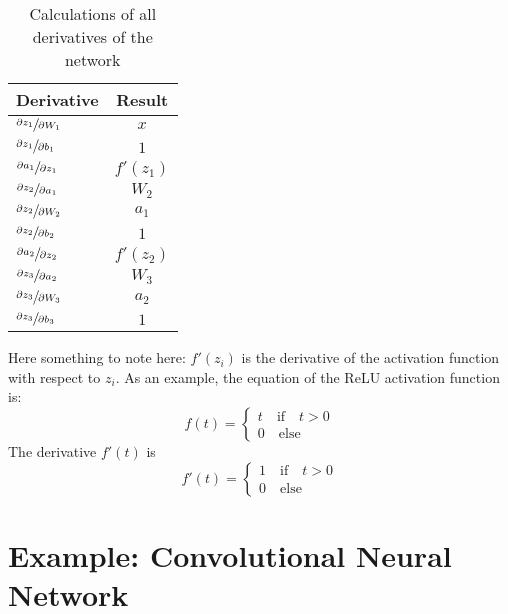 \documentclass[11pt]{article}
\begin{document}
\begin{table}
    \centering
    \begin{tabular}{lc}
        \toprule
            Derivative & Result  \\
        \midrule
            $\sfrac{\partial z_1}{\partial W_1}$     & $ x $ \\
            $\sfrac{\partial z_1}{\partial b_1}$     & $ 1 $ \\
            $\sfrac{\partial a_1}{\partial z_1}$     & $ f'(z_1) $ \\
        \midrule
            $\sfrac{\partial z_2}{\partial a_1}$     & $ W_2 $ \\
            $\sfrac{\partial z_2}{\partial W_2}$     & $ a_1 $ \\
            $\sfrac{\partial z_2}{\partial b_2}$     & $ 1 $ \\
            $\sfrac{\partial a_2}{\partial z_2}$     & $ f'(z_2) $ \\
        \midrule
            $\sfrac{\partial z_3}{\partial a_2}$     & $ W_3 $ \\
            $\sfrac{\partial z_3}{\partial W_3}$     & $ a_2 $ \\
            $\sfrac{\partial z_3}{\partial b_3}$     & $ 1 $ \\
        \bottomrule
    \end{tabular}
    \caption{Calculations of all derivatives of the network}
\end{table}

Here something to note here: $f'(z_i)$ is the derivative of the activation function with respect to $z_i$. As an example, the equation of the ReLU activation function is:
\begin{equation}
    f(t) = \begin{cases}
        t   \quad \text{if} \quad t > 0 \\
        0   \quad \text{else}
    \end{cases}
\end{equation}
The derivative $f'(t)$ is
\begin{equation}
    f'(t) = \begin{cases}
        1   \quad \text{if} \quad t > 0 \\
        0   \quad \text{else}
    \end{cases}
\end{equation}


\section{Example: Convolutional Neural Network}
\end{document}
